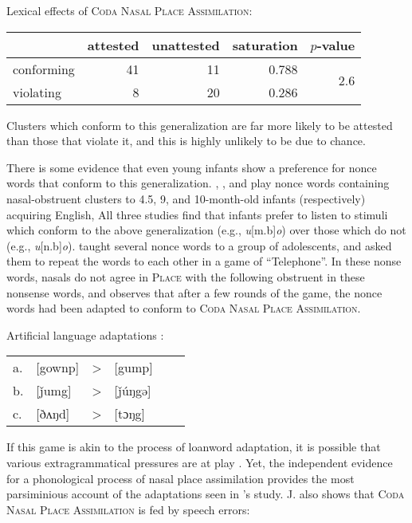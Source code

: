 \ex Lexical effects of \textsc{Coda Nasal Place Assimilation}: \vspace{6pt} \\
\begin{tabular}{l r r r r}
\toprule
           & attested & unattested & saturation & $p$-value \\
\midrule
conforming & 41 & 11 & 0.788 & \multirow{2}{*}{2.6\e{-05}}\\
violating  & 8  & 20 & 0.286 \\
\bottomrule
\end{tabular}
\xe

\noindent
Clusters which conform to this generalization are far more likely to be attested than those that violate it, and this is highly unlikely to be due to chance.

There is some evidence that even young infants show a preference for nonce words that conform to this generalization. %
\citet{Davidson2004}, \citet{Mattys1999}, and \citet{Jusczyk2002} play nonce words containing nasal-obstruent clusters to 4.5, 9, and 10-month-old infants (respectively) acquiring English, All three studies find that infants prefer to listen to stimuli which conform to the above generalization (e.g., \emph{u}[m.b]\emph{o}) over those which do not (e.g., \emph{u}[n.b]\emph{o}). \citet{Wright1975} taught several nonce words to a group of adolescents, and asked them to repeat the words to each other in a game of ``Telephone''. In these nonse words, nasals do not agree in \textsc{Place} with the following obstruent in these nonsense words, and \citeauthor{Wright1975} observes that after a few rounds of the game, the nonce words had been adapted to conform to \textsc{Coda Nasal Place Assimilation}.

\ex Artificial language adaptations \citep[][394, his transcriptions]{Wright1975}: \\
\begin{tabular}{l l l l l l}
a. & [gownp] & > & [gump] \\
b. & [ǰumg]  & > & [ǰúŋgə] \\
c. & [ðʌŋd]  & > & [tɔŋg] \\
\end{tabular} 
\xe

\noindent
If this game is akin to the process of loanword adaptation, it is possible that various extragrammatical pressures are at play \citep[e.g.,][]{Halle1998b,Dupoux1999,Ussishkin2003,Peperkamp2008}. Yet, the independent evidence for a phonological process of nasal place assimilation provides the most parsiminious account of the adaptations seen in \citeauthor{Wright1975}'s study. J. \citet{Myers1993} also shows that \textsc{Coda Nasal Place Assimilation} is fed by speech errors:

